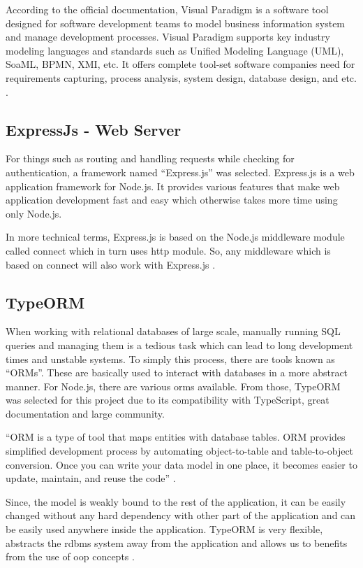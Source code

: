 \documentclass[12pt]{report}
\begin{document}
According to the official documentation, Visual Paradigm is a software tool designed for software development teams to model business information system and manage development processes. Visual Paradigm supports key industry modeling languages and standards such as Unified Modeling Language (UML), SoaML, BPMN, XMI, etc. It offers complete tool-set software companies need for requirements capturing, process analysis, system design, database design, and etc. \cite{vparadigm_2020_introduction}.

\subsection{ExpressJs - Web Server}
For things such as routing and handling requests while checking for authentication, a framework named ``Express.js'' was selected. Express.js is a web application framework for Node.js. It provides various features that make web application development fast and easy which otherwise takes more time using only Node.js.

In more technical terms, Express.js is based on the Node.js middleware module called connect which in turn uses http module. So, any middleware which is based on connect will also work with Express.js \cite{azatmardan_2014_expressjs}.

\subsection{TypeORM}
When working with relational databases of large scale, manually running SQL queries and managing them is a tedious task which can lead to long development times and unstable systems. To simply this process, there are tools known as ``ORMs''. These are basically used to interact with databases in a more abstract manner. For Node.js, there are various \acrshort{orm}s available. From those, TypeORM was selected for this project due to its compatibility with TypeScript, great documentation and large community.

``ORM is a type of tool that maps entities with database tables. ORM provides simplified development process by automating object-to-table and table-to-object conversion. Once you can write your data model in one place, it becomes easier to update, maintain, and reuse the code'' \cite{tpoint_2020_typeorm}.

Since, the model is weakly bound to the rest of the application, it can be easily changed without any hard dependency with other part of the application and can be easily used anywhere inside the application. TypeORM is very flexible, abstracts the \acrshort{rdbms} system away from the application and allows us to benefits from the use of \acrshort{oop} concepts \cite{tpoint_2020_typeorm}.
\end{document}
